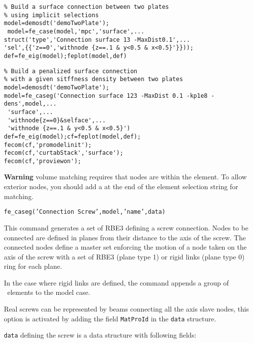 \begin{SDT}
\begin{verbatim}
% Build a surface connection between two plates
% using implicit selections
model=demosdt('demoTwoPlate');
 model=fe_case(model,'mpc','surface',...
struct('type','Connection surface 13 -MaxDist0.1',...
'sel',{{'z==0','withnode {z==.1 & y<0.5 & x<0.5}'}}));
def=fe_eig(model);feplot(model,def)
\end{verbatim}%

\begin{verbatim}
% Build a penalized surface connection 
% with a given sitffness density between two plates
model=demosdt('demoTwoPlate');
model=fe_caseg('Connection surface 123 -MaxDist 0.1 -kp1e8 -dens',model,...
 'surface',...
 'withnode{z==0}&selface',...
 'withnode {z==.1 & y<0.5 & x<0.5}')
def=fe_eig(model);cf=feplot(model,def);
fecom(cf,'promodelinit');
fecom(cf,'curtabStack','surface');
fecom(cf,'proviewon');
\end{verbatim}%


{\bf Warning} volume matching requires that nodes are within the element. To allow exterior nodes, you should add a  at the end of the element selection string for matching.



{\tt fe\_caseg('Connection Screw',model,'name',data)}

This command generates a set of RBE3 defining a screw connection. Nodes to be connected are defined in planes from their distance to the axis of the screw. The connected nodes define a master set enforcing the motion of a node taken on the axis of the screw with a set of RBE3 (plane type 1) or rigid links (plane type 0) ring for each plane. 

In the case where rigid links are defined, the command appends a group of \rigid\ elements to the model case.

Real screws can be represented by beams connecting all the axis slave nodes, this option is activated by adding the field {\tt MatProId} in the {\tt data} structure.  

{\tt data} defining the screw is a data structure with following fields:

\vs\noindent\begin{tabular}{@{}p{}@{}p{}@{}}


\end{tabular}
\end{SDT}
